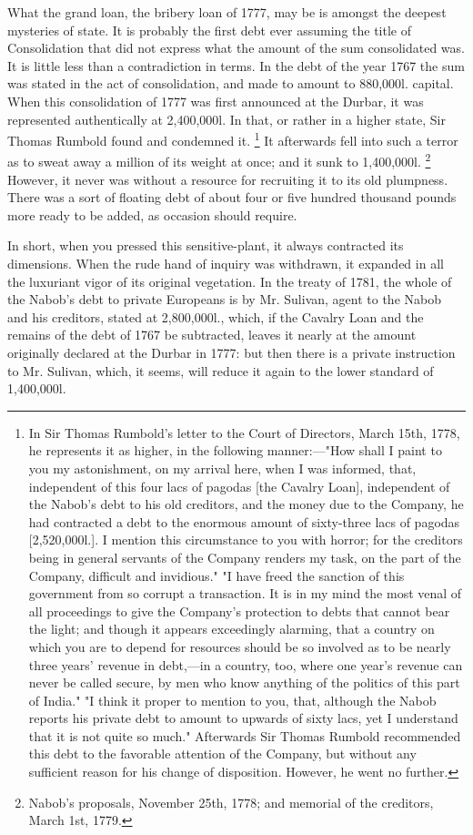 What the grand loan, the bribery loan of 1777, may be is amongst the deepest mysteries of state. It is probably the first debt ever assuming the title of Consolidation that did not express what the amount of the sum consolidated was. It is little less than a contradiction in terms. In the debt of the year 1767 the sum was stated in the act of consolidation, and made to amount to 880,000l. capital. When this consolidation of 1777 was first announced at the Durbar, it was represented authentically at 2,400,000l. In that, or rather in a higher state, Sir Thomas Rumbold found and condemned it.
\footnote{ In Sir Thomas Rumbold's letter to the Court of Directors, March 15th, 1778, he represents it as higher, in the following manner:—"How shall I paint to you my astonishment, on my arrival here, when I was informed, that, independent of this four lacs of pagodas [the Cavalry Loan], independent of the Nabob's debt to his old creditors, and the money due to the Company, he had contracted a debt to the enormous amount of sixty-three lacs of pagodas [2,520,000l.]. I mention this circumstance to you with horror; for the creditors being in general servants of the Company renders my task, on the part of the Company, difficult and invidious." "I have freed the sanction of this government from so corrupt a transaction. It is in my mind the most venal of all proceedings to give the Company's protection to debts that cannot bear the light; and though it appears exceedingly alarming, that a country on which you are to depend for resources should be so involved as to be nearly three years' revenue in debt,—in a country, too, where one year's revenue can never be called secure, by men who know anything of the politics of this part of India." "I think it proper to mention to you, that, although the Nabob reports his private debt to amount to upwards of sixty lacs, yet I understand that it is not quite so much." Afterwards Sir Thomas Rumbold recommended this debt to the favorable attention of the Company, but without any sufficient reason for his change of disposition. However, he went no further.}
 It afterwards fell into such a terror as to sweat away a million of its weight at once; and it sunk to 1,400,000l.
\footnote{ Nabob's proposals, November 25th, 1778; and memorial of the creditors, March 1st, 1779.}
 However, it never was without a resource for recruiting it to its old plumpness. There was a sort of floating debt of about four or five hundred thousand pounds more ready to be added, as occasion should require.

In short, when you pressed this sensitive-plant, it always contracted its dimensions. When the rude hand of inquiry was withdrawn, it expanded in all the luxuriant vigor of its original vegetation. In the treaty of 1781, the whole of the Nabob's debt to private Europeans is by Mr. Sulivan, agent to the Nabob and his creditors, stated at 2,800,000l., which, if the Cavalry Loan and the remains of the debt of 1767 be subtracted, leaves it nearly at the amount originally declared at the Durbar in 1777: but then there is a private instruction to Mr. Sulivan, which, it seems, will reduce it again to the lower standard of 1,400,000l.

